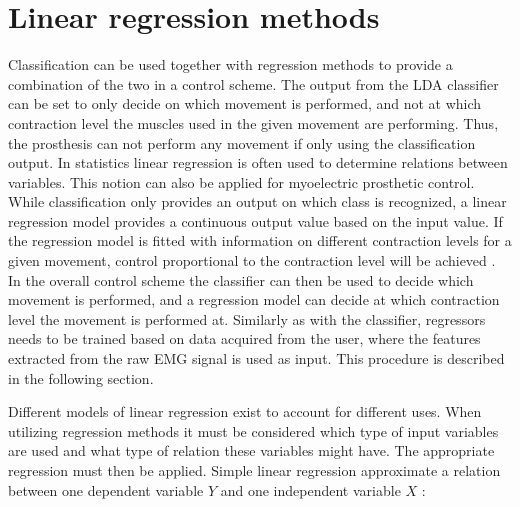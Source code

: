 \section{Linear regression methods} \label{sec:BG:linearRegressionMethods}
Classification can be used together with regression methods to provide a combination of the two in a control scheme. The output from the LDA classifier can be set to only decide on which movement is performed, and not
at which contraction level the muscles used in the given movement are performing. Thus, the prosthesis can not perform any movement if only using the classification output.  In statistics linear regression is often used to determine relations between variables. This notion can also be applied for myoelectric prosthetic control. While classification only provides an output on which class is recognized, a linear regression model provides a continuous output value based on the input value. If the regression model is fitted with information on different contraction levels for a given movement, control proportional to the contraction level will be achieved \cite{Hwang2017, Hahne2014, Bruun2017}. In the overall control scheme the classifier can then be used to decide which movement is performed, and a regression model can decide at which contraction level the movement is performed at. Similarly as with the classifier, regressors needs to be trained based on data acquired from the user, where the features extracted from the raw EMG signal is used as input. This procedure is described in the following section. 

Different models of linear regression exist to account for different uses. When utilizing regression methods it must be considered which type of input variables are used and what type of relation these variables might have. The appropriate regression must then be applied. Simple linear regression approximate a relation between one dependent variable $Y$ and one independent variable $X$ \cite{Zar2009}:


